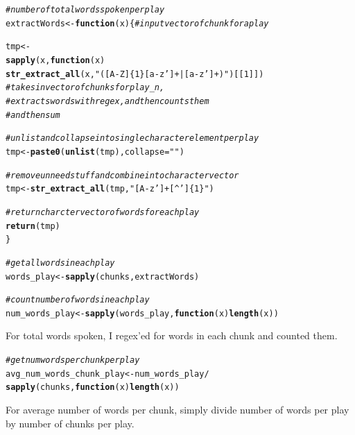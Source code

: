 \documentclass{article}\usepackage[]{graphicx}\usepackage[]{color}
\makeatletter
\newcommand{\hlnum}[1]{\textcolor[rgb]{0.686,0.059,0.569}{#1}}%
\newcommand{\hlstr}[1]{\textcolor[rgb]{0.192,0.494,0.8}{#1}}%
\newcommand{\hlcom}[1]{\textcolor[rgb]{0.678,0.584,0.686}{\textit{#1}}}%
\newcommand{\hlopt}[1]{\textcolor[rgb]{0,0,0}{#1}}%
\newcommand{\hlstd}[1]{\textcolor[rgb]{0.345,0.345,0.345}{#1}}%
\newcommand{\hlkwa}[1]{\textcolor[rgb]{0.161,0.373,0.58}{\textbf{#1}}}%
\newcommand{\hlkwb}[1]{\textcolor[rgb]{0.69,0.353,0.396}{#1}}%
\newcommand{\hlkwc}[1]{\textcolor[rgb]{0.333,0.667,0.333}{#1}}%
\newcommand{\hlkwd}[1]{\textcolor[rgb]{0.737,0.353,0.396}{\textbf{#1}}}%
\newenvironment{kframe}{%
 \def\at@end@of@kframe{}%
 \ifinner\ifhmode%
  \def\at@end@of@kframe{\end{minipage}}%
  \begin{minipage}{\columnwidth}%
 \fi\fi%
 \def\FrameCommand##1{\hskip\@totalleftmargin \hskip-\fboxsep
 \colorbox{shadecolor}{##1}\hskip-\fboxsep
     \hskip-\linewidth \hskip-\@totalleftmargin \hskip\columnwidth}%
 \MakeFramed {\advance\hsize-\width
   \@totalleftmargin\z@ \linewidth\hsize
   \@setminipage}}%
 {\par\unskip\endMakeFramed%
 \at@end@of@kframe}
\newenvironment{knitrout}{}{} %
\makeatother
\begin{document}
\begin{knitrout}
\color{fgcolor}\begin{kframe}
\begin{alltt}
\hlcom{#number of total words spoken per play}
\hlstd{extractWords} \hlkwb{<-} \hlkwa{function}\hlstd{(}\hlkwc{x}\hlstd{) \{} \hlcom{#input vector of chunk for a play}

    \hlstd{tmp} \hlkwb{<-}
        \hlkwd{sapply}\hlstd{(x,} \hlkwa{function}\hlstd{(}\hlkwc{x}\hlstd{)}
            \hlkwd{str_extract_all}\hlstd{(x,} \hlstr{"([A-Z]\{1\}[a-z']+|[a-z']+)"}\hlstd{)[[}\hlnum{1}\hlstd{]])}
            \hlcom{#takes in vector of chunks for play_n,}
            \hlcom{#extracts words with regex, and then counts them}
            \hlcom{#and then sum}

    \hlcom{#unlist and collapse into single character element per play}
    \hlstd{tmp} \hlkwb{<-} \hlkwd{paste0}\hlstd{(}\hlkwd{unlist}\hlstd{(tmp),} \hlkwc{collapse} \hlstd{=} \hlstr{" "}\hlstd{)}

    \hlcom{#remove unneed stuff and combine into character vector}
    \hlstd{tmp} \hlkwb{<-} \hlkwd{str_extract_all}\hlstd{(tmp,} \hlstr{"[A-z']+[^ ']\{1\}"}\hlstd{)}

    \hlcom{#return charcter vector of words for each play}
    \hlkwd{return}\hlstd{(tmp)}
\hlstd{\}}

\hlcom{#get all words in each play}
\hlstd{words_play} \hlkwb{<-} \hlkwd{sapply}\hlstd{(chunks, extractWords)}

\hlcom{#count number of words in each play}
\hlstd{num_words_play} \hlkwb{<-} \hlkwd{sapply}\hlstd{(words_play,} \hlkwa{function}\hlstd{(}\hlkwc{x}\hlstd{)} \hlkwd{length}\hlstd{(x))}
\end{alltt}
\end{kframe}
\end{knitrout}
For total words spoken, I regex'ed for words in each chunk and counted them.
\begin{knitrout}
\color{fgcolor}\begin{kframe}
\begin{alltt}
\hlcom{#get num words per chunk per play}
\hlstd{avg_num_words_chunk_play} \hlkwb{<-} \hlstd{num_words_play} \hlopt{/}
                                \hlkwd{sapply}\hlstd{(chunks,} \hlkwa{function}\hlstd{(}\hlkwc{x}\hlstd{)} \hlkwd{length}\hlstd{(x))}
\end{alltt}
\end{kframe}
\end{knitrout}
For average number of words per chunk, simply divide number of words per play by number of chunks per play.
\end{document}
